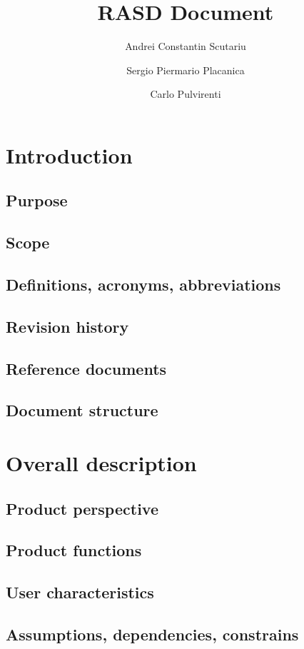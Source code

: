 \documentclass{article}
\author{
Andrei Constantin Scutariu
\and
Sergio Piermario Placanica
\and
Carlo Pulvirenti
}
\title{RASD Document}
\begin{document}
\maketitle

\newpage

\section{Introduction}

\subsection{Purpose}
\subsection{Scope}
\subsection{Definitions, acronyms, abbreviations}
\subsection{Revision history}
\subsection{Reference documents}
\subsection{Document structure}

\newpage

\section{Overall description}

\subsection{Product perspective}
\subsection{Product functions}
\subsection{User characteristics}
\subsection{Assumptions, dependencies, constrains}
\end{document}
